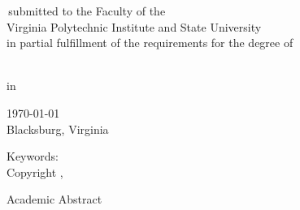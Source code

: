 \documentclass[12pt]{report}
\renewcommand\[{\begin{equation}}
\renewcommand\]{\end{equation}}
\begin{document}
\thispagestyle{empty}


\begin{center}



{\Large
\mytitle
}


\vfill


\myauthor


\vfill


\myreporttype \,submitted to the Faculty of the \\
Virginia Polytechnic Institute and State University \\
in partial fulfillment of the requirements for the degree of


\vfill


\mydegree \\
in \\
\mydepartment


\vfill


\mycommittee


\vfill


\ifx\mydate\undefined
\def\mydate{\today}
\fi
\mydate \\
\ifx\mydefenselocation\undefined
Blacksburg, Virginia
\else
\fi


\vfill

\ifx\myyear\undefined
\def\myyear{\the\year}
\fi

Keywords: \mykeywords \\
Copyright \myyear, \myauthor


\end{center}


\pagebreak


\thispagestyle{empty}

\begin{center}


{\large \mytitle}


\vfill


\myauthor


\vfill


Academic Abstract


\vfill


\end{center}

\ifx\myabstract\undefined
\end{document}
